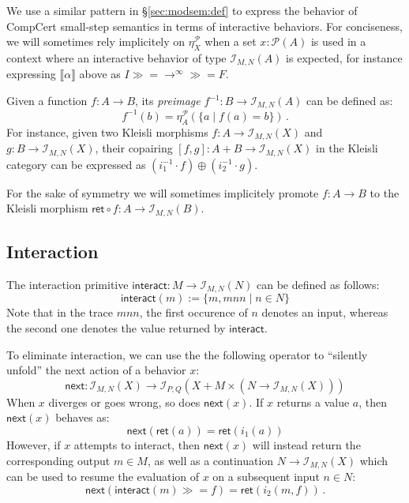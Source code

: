 \documentclass[acmsmall,timestamp,review]{acmart}
\newcommand{\kw}[1]{\ensuremath{ \mathsf{#1} }}
\newcommand{\bind}{\gg\!\!=}
\begin{document}
We use a similar pattern in \S\ref{sec:modsem:def}
to express the behavior of CompCert small-step semantics
in terms of interactive behaviors.
For conciseness,
we will sometimes rely implicitely on $\eta_X^\mathcal{P}$
when a set $x : \mathcal{P}(A)$ is used
in a context where an interactive behavior
of type $\mathcal{I}_{M,N}(A)$ is expected,
for instance expressing $\llbracket \alpha \rrbracket$ above as
$I \bind {\rightarrow}^\infty \bind F$.

Given a function $f : A \rightarrow B$,
its \emph{preimage}
$f^{-1} : B \rightarrow \mathcal{I}_{M,N}(A)$
can be defined as:
\[
    f^{-1}(b) = \eta^\mathcal{P}_A(\{ a \mid f(a) = b \}) \,.
\]
For instance, given two Kleisli morphisms
$f : A \rightarrow \mathcal{I}_{M,N}(X)$ and
$g : B \rightarrow \mathcal{I}_{M,N}(X)$,
their copairing $[f, g] : A + B \rightarrow \mathcal{I}_{M,N}(X)$
in the Kleisli category can be expressed as
$(i_1^{-1} \cdot f) \oplus (i_2^{-1} \cdot g)$.

For the sake of symmetry we will sometimes implicitely promote
$f : A \rightarrow B$ to the Kleisli morphism
$\kw{ret} \circ f : A \rightarrow \mathcal{I}_{M,N}(B)$.


\subsection{Interaction} \label{sec:monad:int} %

The interaction primitive
$\kw{interact} : M \rightarrow \mathcal{I}_{M,N}(N)$
can be defined as follows:
\[
    \kw{interact}(m) := \{ m, mnn \mid n \in N \}
\]
Note that in the trace $mnn$,
the first occurence of $n$ denotes an input,
whereas the second one denotes the value returned by $\kw{interact}$.

To eliminate interaction,
we can use the the following operator to
``silently unfold'' the next action of a behavior $x$:
\[
    \kw{next} :
       \mathcal{I}_{M,N}(X) \rightarrow
       \mathcal{I}_{P,Q}(X + M \times (N \rightarrow \mathcal{I}_{M,N}(X)))
\]
When $x$ diverges or goes wrong, so does $\kw{next}(x)$.
If $x$ returns a value $a$, then $\kw{next}(x)$ behaves as:
\[
    \kw{next}(\kw{ret}(a)) = \kw{ret}(i_1(a))
\]
However,
if $x$ attempts to interact,
then $\kw{next}(x)$ will instead
return the corresponding output $m \in M$,
as well as a continuation $N \rightarrow \mathcal{I}_{M,N}(X)$
which can be used to resume the evaluation of $x$
on a subsequent input $n \in N$:
\[
    \kw{next}(\kw{interact}(m) \bind f) = \kw{ret}(i_2(m, f)) \,.
\]
\end{document}
